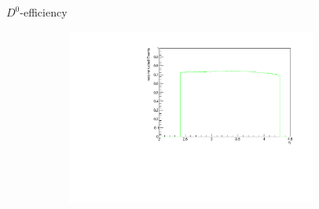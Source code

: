 \documentclass[11pt]{beamer}
\begin{document}
\begin{frame}{$D^0$-efficiency}
\begin{figure}
\begin{subfigure}{0.45\textwidth}
\end{subfigure}
\begin{subfigure}{0.45\textwidth}
\includegraphics[width=0.9\textwidth]{up_pdf/single/tot/h_eta_reco_D0.pdf}
\end{subfigure}
\end{figure}
\end{frame}
\end{document}
